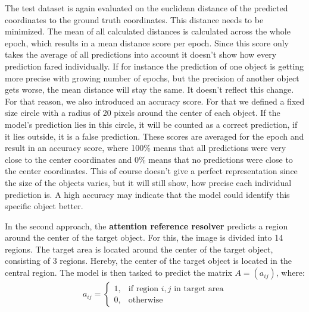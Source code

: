 The test dataset is again evaluated on the euclidean distance of the predicted coordinates to the ground truth coordinates.
This distance needs to be minimized.
The mean of all calculated distances is calculated across the whole epoch, which results in a mean distance score per epoch.
Since this score only takes the average of all predictions into account it doesn't show how every prediction fared individually.
If for instance the prediction of one object is getting more precise with growing number of epochs, but the precision of another object gets worse, the mean distance will stay the same.
It doesn't reflect this change.
For that reason, we also introduced an accuracy score.
For that we defined a fixed size circle with a radius of 20 pixels around the center of each object.
If the model's prediction lies in this circle, it will be counted as a correct prediction, if it lies outside, it is a false prediction.
These scores are averaged for the epoch and result in an accuracy score, where 100\% means that all predictions were very close to the center coordinates and 0\% means that no predictions were close to the center coordinates.
This of course doesn't give a perfect representation since the size of the objects varies, but it will still show, how precise each individual prediction is.
A high accuracy may indicate that the model could identify this specific object better.

In the second approach, the \textbf{attention reference resolver} predicts a region around the center of the target object.
For this, the image is divided into 14 regions.
The target area is located around the center of the target object, consisting of 3 regions.
Hereby, the center of the target object is located in the central region.
The model is then tasked to predict the matrix $A = (a_{ij})$, where:
\begin{align*}
    a_{ij} =
    \begin{cases}
        1, & \text{if region $i,j$ in target area} \\
        0, & \text{otherwise}
    \end{cases}
\end{align*}

